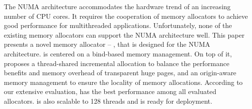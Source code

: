The NUMA architecture accommodates the hardware trend of an increasing number of CPU cores. It requires the cooperation of memory allocators to achieve good performance for multithreaded applications. Unfortunately, none of the existing memory allocators can support the NUMA architecture well.
This paper presents a novel memory allocator -- \NM{}, that is designed for the NUMA architecture. \NM{} is centered on a bind-based memory management. On top of it, \NM{} proposes a thread-shared incremental allocation to balance the performance benefits and memory overhead of transparent huge pages, and
an origin-aware memory management to ensure the locality of memory allocations. 
According to our extensive evaluation, \NM{} has the best performance among all evaluated allocators.  \NM{} is also scalable to 128 threads and is ready for deployment.